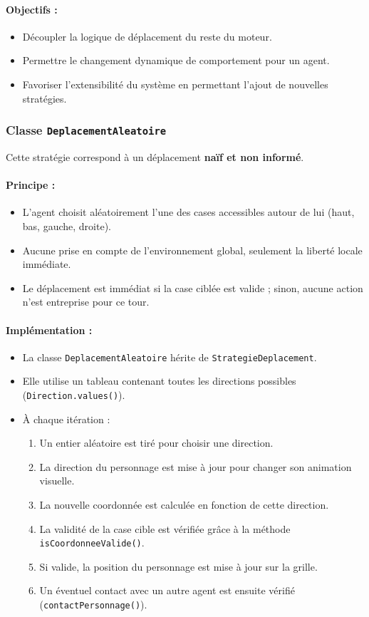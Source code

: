 \paragraph{Objectifs :}
\begin{itemize}
    \item Découpler la logique de déplacement du reste du moteur.
    \item Permettre le changement dynamique de comportement pour un agent.
    \item Favoriser l'extensibilité du système en permettant l’ajout de nouvelles stratégies.
\end{itemize}
\subsubsection{ Classe \texttt{DeplacementAleatoire}}

Cette stratégie correspond à un déplacement \textbf{naïf et non informé}.

\paragraph{Principe :}
\begin{itemize}
    \item L’agent choisit aléatoirement l’une des cases accessibles autour de lui (haut, bas, gauche, droite).
    \item Aucune prise en compte de l’environnement global, seulement la liberté locale immédiate.
    \item Le déplacement est immédiat si la case ciblée est valide ; sinon, aucune action n'est entreprise pour ce tour.
\end{itemize}

\paragraph{Implémentation :}
\begin{itemize}
    \item La classe \texttt{DeplacementAleatoire} hérite de \texttt{StrategieDeplacement}.
    \item Elle utilise un tableau contenant toutes les directions possibles (\texttt{Direction.values()}).
    \item À chaque itération :
    \begin{enumerate}
        \item Un entier aléatoire est tiré pour choisir une direction.
        \item La direction du personnage est mise à jour pour changer son animation visuelle.
        \item La nouvelle coordonnée est calculée en fonction de cette direction.
        \item La validité de la case cible est vérifiée grâce à la méthode \texttt{isCoordonneeValide()}.
        \item Si valide, la position du personnage est mise à jour sur la grille.
        \item Un éventuel contact avec un autre agent est ensuite vérifié (\texttt{contactPersonnage()}).
    \end{enumerate}
\end{itemize}

